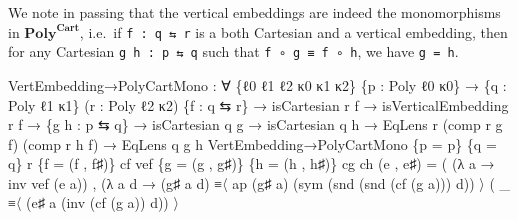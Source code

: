 \documentclass[
  11pt,
  oneside,
  article]{memoir}
\newenvironment{Shaded}{}{}
\newcommand{\NormalTok}[1]{#1}
\newcommand{\OtherTok}[1]{\textcolor[rgb]{0.00,0.44,0.13}{#1}}
\theoremstyle{definition}
\theoremstyle{plain}
\newcommand{\0}{\textsf{0}}
\newcommand{\1}{\tn{\textsf{1}}}
\begin{document}
We note in passing that the vertical embeddings are indeed the
monomorphisms in \(\mathbf{Poly}^{\mathbf{Cart}}\), i.e.~if
\texttt{f\ :\ q\ ⇆\ r} is a both Cartesian and a vertical embedding,
then for any Cartesian \texttt{g\ h\ :\ p\ ⇆\ q} such that
\texttt{f\ ∘\ g\ ≡\ f\ ∘\ h}, we have \texttt{g\ =\ h}.

\begin{Shaded}
\begin{Highlighting}[]
\NormalTok{VertEmbedding→PolyCartMono }\OtherTok{:} 
    \OtherTok{∀} \OtherTok{\{}\NormalTok{ℓ0 ℓ1 ℓ2 κ0 κ1 κ2}\OtherTok{\}} \OtherTok{\{}\NormalTok{p }\OtherTok{:}\NormalTok{ Poly ℓ0 κ0}\OtherTok{\}}
    \OtherTok{→} \OtherTok{\{}\NormalTok{q }\OtherTok{:}\NormalTok{ Poly ℓ1 κ1}\OtherTok{\}} \OtherTok{(}\NormalTok{r }\OtherTok{:}\NormalTok{ Poly ℓ2 κ2}\OtherTok{)} \OtherTok{\{}\NormalTok{f }\OtherTok{:}\NormalTok{ q ⇆ r}\OtherTok{\}}
    \OtherTok{→}\NormalTok{ isCartesian r f }\OtherTok{→}\NormalTok{ isVerticalEmbedding r f}
    \OtherTok{→} \OtherTok{\{}\NormalTok{g h }\OtherTok{:}\NormalTok{ p ⇆ q}\OtherTok{\}} \OtherTok{→}\NormalTok{ isCartesian q g }\OtherTok{→}\NormalTok{ isCartesian q h}
    \OtherTok{→}\NormalTok{ EqLens r }\OtherTok{(}\NormalTok{comp r g f}\OtherTok{)} \OtherTok{(}\NormalTok{comp r h f}\OtherTok{)}
    \OtherTok{→}\NormalTok{ EqLens q g h}
\NormalTok{VertEmbedding→PolyCartMono }\OtherTok{\{}\NormalTok{p }\OtherTok{=}\NormalTok{ p}\OtherTok{\}} \OtherTok{\{}\NormalTok{q }\OtherTok{=}\NormalTok{ q}\OtherTok{\}}\NormalTok{ r }\OtherTok{\{}\NormalTok{f }\OtherTok{=} \OtherTok{(}\NormalTok{f , f♯}\OtherTok{)\}}\NormalTok{ cf vef }
                           \OtherTok{\{}\NormalTok{g }\OtherTok{=} \OtherTok{(}\NormalTok{g , g♯}\OtherTok{)\}} \OtherTok{\{}\NormalTok{h }\OtherTok{=} \OtherTok{(}\NormalTok{h , h♯}\OtherTok{)\}}\NormalTok{ cg ch }\OtherTok{(}\NormalTok{e , e♯}\OtherTok{)} \OtherTok{=} 
    \OtherTok{(} \OtherTok{(λ}\NormalTok{ a }\OtherTok{→}\NormalTok{ inv vef }\OtherTok{(}\NormalTok{e a}\OtherTok{))} 
\NormalTok{    , }\OtherTok{(λ}\NormalTok{ a d }\OtherTok{→} \OtherTok{(}\NormalTok{g♯ a d}\OtherTok{)} 
\NormalTok{                   ≡〈 ap }\OtherTok{(}\NormalTok{g♯ a}\OtherTok{)} \OtherTok{(}\NormalTok{sym }\OtherTok{(}\NormalTok{snd }\OtherTok{(}\NormalTok{snd }\OtherTok{(}\NormalTok{cf }\OtherTok{(}\NormalTok{g a}\OtherTok{)))}\NormalTok{ d}\OtherTok{))}\NormalTok{ 〉 }
               \OtherTok{(} \OtherTok{\_}\NormalTok{ ≡〈 }\OtherTok{(}\NormalTok{e♯ a }\OtherTok{(}\NormalTok{inv }\OtherTok{(}\NormalTok{cf }\OtherTok{(}\NormalTok{g a}\OtherTok{))}\NormalTok{ d}\OtherTok{))}\NormalTok{ 〉 }

\end{Highlighting}
\end{Shaded}
\end{document}
